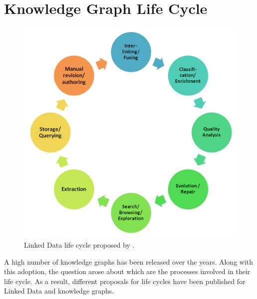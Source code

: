 \section{Knowledge Graph Life Cycle }
\label{sec:chp2_kg_lifecycle}





\begin{figure}[t]
\centering
\includegraphics[width=0.55\linewidth]{figures/chp2_LD-lifecycle.png}
\caption{Linked Data life cycle proposed by \cite{ngomo2014LD-lifecycle}.}
\label{fig:chp2_LD-lifecycle}
\end{figure}

A high number of knowledge graphs has been released over the years. 
Along with this adoption, the question arose about which are the processes involved in their life cycle. 
As a result, different proposals for life cycles have been published for Linked Data and knowledge graphs.

